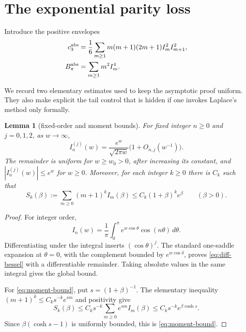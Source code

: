 \documentclass[11pt]{article}
\newtheorem{lemma}[theorem]{Lemma}
\theoremstyle{definition}
\theoremstyle{remark}
\begin{document}
\section{The exponential parity loss}

Introduce the positive envelopes
\begin{align}
 c_3^{\rm abs}&=\frac{1}{6}\sum_{m\ge1}
 m(m+1)(2m+1)I_m^2I_{m+1}^2,\label{eq:cabs}\\
 B_\pi^{\rm abs}&=\sum_{m\ge1}m^2I_m^4.\label{eq:babs}
\end{align}

We record two elementary estimates used to keep the asymptotic proof
uniform.  They also make explicit the tail control that is hidden if one
invokes Laplace's method only formally.

\begin{lemma}[fixed-order and moment bounds]\label{lem:bounds}
For fixed integer $n\geq0$ and $j=0,1,2$, as $w\to\infty$,
\begin{equation}\label{eq:diff-bessel}
 I_n^{(j)}(w)=\frac{e^w}{\sqrt{2\pi w}}
 \bigl(1+O_{n,j}(w^{-1})\bigr).
\end{equation}
The remainder is uniform for $w\geq w_0>0$, after increasing its
constant, and $|I_n^{(j)}(w)|\leq e^w$ for $w\geq0$.  Moreover, for each
integer $k\geq0$ there is $C_k$ such that
\begin{equation}\label{eq:moment-bound}
 S_k(\beta):=\sum_{m\geq0}(m+1)^kI_m(\beta)
 \leq C_k(1+\beta)^ke^\beta
 \qquad(\beta>0).
\end{equation}
\end{lemma}

\begin{proof}
For integer order,
\[
 I_n(w)=\frac1\pi\int_0^\pi e^{w\cos\theta}
 \cos(n\theta)\,d\theta.
\]
Differentiating under the integral inserts $(\cos\theta)^j$.
The standard one-saddle expansion at $\theta=0$, with the complement
bounded by $e^{w\cos\delta}$, proves \eqref{eq:diff-bessel} with a
differentiable remainder.  Taking absolute values in the same integral
gives the global bound.

For \eqref{eq:moment-bound}, put $s=(1+\beta)^{-1}$.  The elementary
inequality $(m+1)^k\leq C_ks^{-k}e^{sm}$ and positivity give
\[
 S_k(\beta)\leq C_ks^{-k}\sum_{m\geq0}e^{sm}I_m(\beta)
 \leq C_ks^{-k}e^{\beta\cosh s}.
\]
Since $\beta(\cosh s-1)$ is uniformly bounded, this is
\eqref{eq:moment-bound}.
\end{proof}
\end{document}
